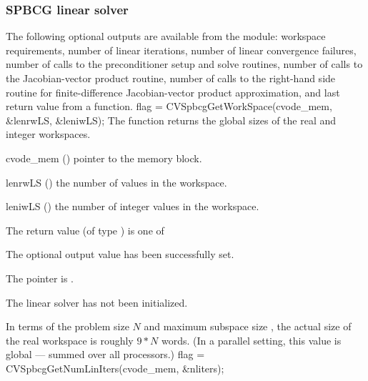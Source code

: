 \subsubsection{SPBCG linear solver}\label{sss:optout_spbcg}
The following optional outputs are available from the {\cvspbcg}
module: workspace requirements, number of linear iterations, number of
linear convergence failures, number of calls to the preconditioner
setup and solve routines, number of calls to the Jacobian-vector
product routine, number of calls to the right-hand side routine for
finite-difference Jacobian-vector product approximation, and last
return value from a {\cvspbcg} function.
{
  flag = CVSpbcgGetWorkSpace(cvode\_mem, \&lenrwLS, \&leniwLS);
}
{
  The function  returns the global sizes of the
  {\cvspbcg} real and integer workspaces.
}
{
  \begin{args}
  \item[cvode\_mem] ()
    pointer to the {\cvodes} memory block.
  \item[lenrwLS] ()
    the number of  values in the {\cvspbcg} workspace.
  \item[leniwLS] ()
    the number of integer values in the {\cvspbcg} workspace.
  \end{args}
}
{
  The return value  (of type ) is one of
  \begin{args}
  \item[\Id{CVSPBCG\_SUCCESS}] 
    The optional output value has been successfully set.
  \item[\Id{CVSPBCG\_MEM\_NULL}]
    The  pointer is .
  \item[\Id{CVSPBCG\_LMEM\_NULL}]
    The {\cvspbcg} linear solver has not been initialized.
  \end{args}
}
{
  In terms of the problem size $N$ and maximum subspace size , 
  the actual size of the real workspace is roughly $9*N$  words.
  (In a parallel setting, this value is global --- summed over all processors.)
}
{
  flag = CVSpbcgGetNumLinIters(cvode\_mem, \&nliters);
}
